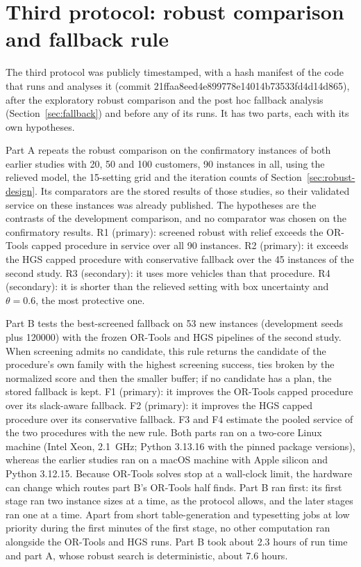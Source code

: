 \documentclass[11pt,a4paper]{article}
\begin{document}
\section{Third protocol: robust comparison and fallback rule}\label{sec:conf3design}

The third protocol \cite{ali2026freeze3} was publicly timestamped, with a hash
manifest of the code that runs and analyses it (commit
21ffaa8eed4e899778e14014b73533fd4d14d865), after the exploratory robust comparison
and the post hoc fallback analysis (Section~\ref{sec:fallback}) and before any of
its runs. It has two parts, each with its own hypotheses.

Part A repeats the robust comparison on the confirmatory instances of both
earlier studies with 20, 50 and 100 customers, 90 instances in all, using the
relieved model, the 15-setting grid and the iteration counts of
Section~\ref{sec:robust-design}. Its comparators are the stored results of those
studies, so their validated service on these instances was already published.
The hypotheses are the contrasts of the development comparison, and no
comparator was chosen on the confirmatory results. R1 (primary): screened robust
with relief exceeds the OR-Tools capped procedure in service over all 90
instances. R2 (primary): it exceeds the HGS capped procedure with conservative
fallback over the 45 instances of the second study. R3 (secondary): it uses
more vehicles than that procedure. R4 (secondary): it is shorter than the
relieved setting with box uncertainty and $\theta=0.6$, the most protective
one.

Part B tests the best-screened fallback on 53 new instances (development seeds
plus 120000) with the frozen OR-Tools and HGS pipelines of the second study.
When screening admits no candidate, this rule returns the candidate of the
procedure's own family with the highest screening success, ties broken by the
normalized score and then the smaller buffer; if no candidate has a plan, the
stored fallback is kept. F1 (primary): it
improves the OR-Tools capped procedure over its slack-aware fallback. F2
(primary): it improves the HGS capped procedure over its conservative fallback.
F3 and F4 estimate the pooled service of the two procedures with the new rule.
Both parts ran on a two-core Linux machine (Intel Xeon, 2.1~GHz; Python 3.13.16
with the pinned package versions), whereas the earlier studies ran on a macOS
machine with Apple silicon and Python 3.12.15. Because OR-Tools solves stop at a wall-clock limit,
the hardware can change which routes part B's OR-Tools half finds. Part B ran
first: its first stage ran two instance sizes at a time, as the protocol allows,
and the later stages ran one at a time. Apart from short table-generation and
typesetting jobs at low priority during the first minutes of the first stage, no
other computation ran alongside the OR-Tools and HGS runs. Part B took about 2.3 hours
of run time and part A, whose robust search is deterministic, about 7.6 hours.
\end{document}
